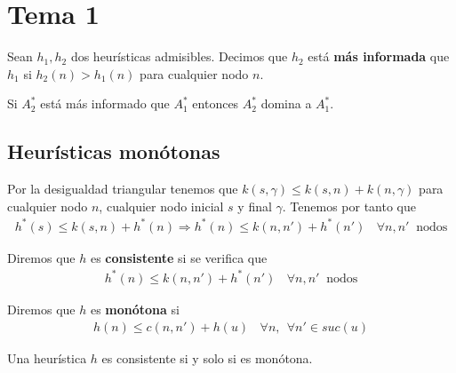 \chapter{Tema 1}

\begin{definicion}
    Sean $h_1, h_2$ dos heurísticas admisibles. Decimos que $h_2$ está \textbf{más informada} que $h_1$ si $h_2(n)>h_1(n)$ para cualquier nodo $n$.
\end{definicion}

\begin{teo}
    Si $A_2^*$ está más informado que $A_1^*$ entonces $A_2^*$ domina a $A_1^*$.
\end{teo}

\section{Heurísticas monótonas}

Por la desigualdad triangular tenemos que $k(s,\gamma) \leq k(s,n) + k(n, \gamma)$ para cualquier nodo $n$, cualquier nodo inicial $s$ y final $\gamma$. Tenemos por tanto que 
\begin{gather*}
    h^*(s) \leq k(s,n) + h^*(n) \Rightarrow h^*(n) \leq k(n,n') + h^*(n') \ \ \ \ \forall n,n' \ \text{ nodos}
\end{gather*}
\begin{definicion}
    Diremos que $h$ es \textbf{consistente} si se verifica que 
    \begin{gather*}
        h^*(n) \leq k(n,n') + h^*(n') \ \ \ \ \forall n,n' \ \text{ nodos}
    \end{gather*}
\end{definicion}

\begin{definicion}
    Diremos que $h$ es \textbf{monótona} si
    \begin{gather*}
        h(n)\leq c(n,n')+h(u) \ \ \ \ \forall n,\ \ \forall n'\in suc(u)
    \end{gather*}
\end{definicion}

\begin{prop}
    Una heurística $h$ es consistente si y solo si es monótona.
\end{prop}

